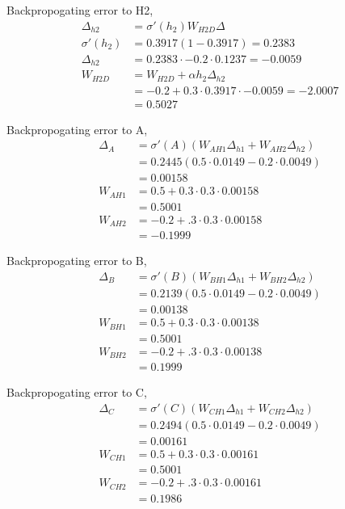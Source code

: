 \documentclass[11pt]{article}
\begin{document}
Backpropogating error to H2,
\begin{align*}
	\Delta_{h2}  &= \sigma'(h_2) W_{H2D} \Delta \\
	\sigma'(h_2) &= 0.3917 ( 1 - 0.3917) = 0.2383 \\
	\Delta_{h2}  &= 0.2383 \cdot -0.2 \cdot 0.1237 = -0.0059 \\
	W_{H2D} &= W_{H2D} + \alpha h_2 \Delta_{h2} \\
		&= -0.2 + 0.3 \cdot 0.3917 \cdot -0.0059 = -2.0007 \\
		&= 0.5027
\end{align*}

Backpropogating error to A,
\begin{align*}
	\Delta_{A} &= \sigma'(A) ( W_{AH1} \Delta_{h1}  + W_{AH2} \Delta_{h2} ) \\
						 &= 0.2445 ( 0.5 \cdot 0.0149 - 0.2 \cdot 0.0049) \\
						 &= 0.00158 \\
	W_{AH1} 	 &= 0.5 + 0.3 \cdot 0.3 \cdot 0.00158 \\
						 &= 0.5001 \\
	W_{AH2}		 &= -0.2 + .3 \cdot 0.3 \cdot 0.00158 \\
						 &= -0.1999
\end{align*}

Backpropogating error to B,
\begin{align*}
	\Delta_{B} &= \sigma'(B) ( W_{BH1} \Delta_{h1}  + W_{BH2} \Delta_{h2} ) \\
						 &= 0.2139 ( 0.5 \cdot 0.0149 - 0.2 \cdot 0.0049) \\
						 &= 0.00138 \\
	W_{BH1} 	 &= 0.5 + 0.3 \cdot 0.3 \cdot 0.00138 \\
						 &= 0.5001 \\
	W_{BH2}		 &= -0.2 + .3 \cdot 0.3 \cdot 0.00138 \\
						 &= 0.1999
\end{align*}

Backpropogating error to C,
\begin{align*}
	\Delta_{C} &= \sigma'(C) ( W_{CH1} \Delta_{h1}  + W_{CH2} \Delta_{h2} ) \\
						 &= 0.2494 ( 0.5 \cdot 0.0149 - 0.2 \cdot 0.0049) \\
						 &= 0.00161 \\
	W_{CH1} 	 &= 0.5 + 0.3 \cdot 0.3 \cdot 0.00161 \\
						 &= 0.5001 \\
	W_{CH2}		 &= -0.2 + .3 \cdot 0.3 \cdot 0.00161 \\
						 &= 0.1986
\end{align*}
\end{document}
